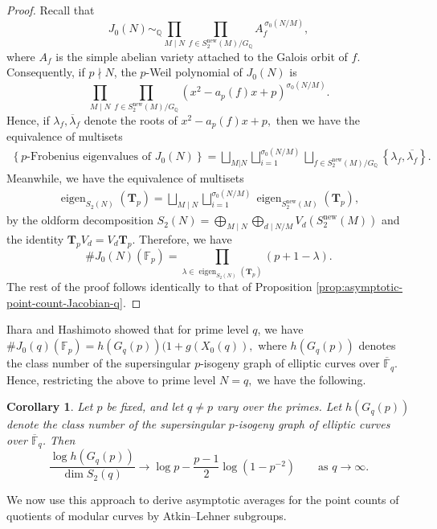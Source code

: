 \documentclass[11pt,letterpaper,reqno]{amsart}
\newtheorem{corollary}[theorem]{Corollary}
\theoremstyle{definition}
\numberwithin{equation}{section}
\numberwithin{figure}{section}
\numberwithin{table}{section}
\newcommand{\nw}{\mathrm{new}}
\newcommand{\eigen}{\operatorname{eigen}}
\begin{document}
\begin{proof}
Recall that
\[
J_0(N)\sim_{\mathbb{Q}}
\prod_{M\mid N}
\prod_{f\in S_2^{\mathrm{new}}(M)/G_{\mathbb{Q}}}
A_f^{\,\sigma_0(N/M)},
\]
where $A_f$ is the simple abelian variety attached to the Galois orbit of $f$. Consequently, if $p\nmid N$, the $p$-Weil polynomial of $J_0(N)$ is
\[
\prod_{M\mid N}
\prod_{f\in S_2^{\mathrm{new}}(M)/G_{\mathbb{Q}}}
\left(x^2-a_p(f)x+p\right)^{\sigma_0(N/M)}.
\]
Hence, if $\lambda_f,\overline{\lambda}_f$ denote the roots of $x^2-a_p(f)x+p,$ then we have the equivalence of multisets
\begin{align}
    \left\{ \text{$p$-Frobenius eigenvalues of $J_0(N)$} \right\} = \bigsqcup_{M|N} \bigsqcup_{i = 1}^{\sigma_0(N/M)} \bigsqcup_{f\in S_2^{\mathrm{new}}(M)/G_{\mathbb{Q}}} \left\{ \lambda_f, \overline{\lambda_{f}} \right\}.
\end{align}
Meanwhile, we have the equivalence of multisets
\begin{align}
    \eigen_{S_2(N)}(\mathbf{T}_p) = \bigsqcup_{M \mid N} \bigsqcup_{i = 1}^{\sigma_0(N/M)} \eigen_{S_2^\nw(M)}(\mathbf{T}_p),
\end{align}
by the oldform decomposition $S_2(N) = \bigoplus_{M\mid N}
\bigoplus_{d\mid N/M} V_d\!\left(S_2^{\mathrm{new}}(M)\right)$ and the identity $\mathbf{T}_p V_d = V_d \mathbf{T}_p.$ Therefore, we have
\[
\#J_0(N)(\mathbb{F}_p)
=
\prod_{\lambda \in \operatorname{eigen}_{S_2(N)}(\mathbf{T}_p)}
(p+1-\lambda).
\]
The rest of the proof follows identically to that of Proposition \ref{prop:asymptotic-point-count-Jacobian-q}.
\end{proof}

Ihara \cite{Ihara1974} and Hashimoto \cite{Hashimoto1981} showed that for prime level $q$, we have $\#J_0(q)(\mathbb F_{p}) = h(G_q(p)) (1+g(X_0(q)),$ where $h(G_q(p))$ denotes the class number of the supersingular $p$-isogeny graph of elliptic curves over $\overline{\mathbb{F}}_q$. Hence, restricting the above to prime level $N=q,$ we have the following.

\begin{corollary}
Let $p$ be fixed, and let $q\neq p$ vary over the primes. Let $h(G_q(p))$ denote the class number of the supersingular $p$-isogeny graph of elliptic curves over $\overline{\mathbb{F}}_q$. Then
\[
\frac{\log h(G_q(p))}
{\dim S_2(q)}
\longrightarrow
\log p-\frac{p-1}{2}\log\!\left(1-p^{-2} \right)  \qquad \text{as $q \rightarrow \infty$}.
\]
\end{corollary}

We now use this approach to derive asymptotic averages for the point counts of quotients of modular curves by Atkin--Lehner subgroups. 
\end{document}
